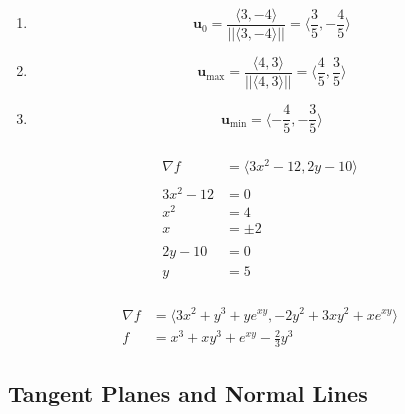 \documentclass{article}
\begin{document}
\setcounter{subsubsection}{32}
\subsubsection{}

\begin{enumerate}
  \item \[\mathbf{u}_0 = \frac{\langle 3, -4 \rangle}{||\langle 3, -4 \rangle||} = \langle \frac{3}{5}, -\frac{4}{5} \rangle\]

  \item \[\mathbf{u}_\text{max} = \frac{\langle 4, 3 \rangle}{||\langle 4, 3 \rangle||} = \langle \frac{4}{5}, \frac{3}{5} \rangle\]

  \item \[\mathbf{u}_\text{min} = \langle -\frac{4}{5}, -\frac{3}{5} \rangle\]
\end{enumerate}

\setcounter{subsubsection}{36}
\subsubsection{}

\begin{align*}
  \nabla f   & = \langle 3 x^2 - 12, 2 y - 10 \rangle \\ \\
  3 x^2 - 12 & = 0                                    \\
  x^2        & = 4                                    \\
  x          & = \pm 2                                \\ \\
  2 y - 10   & = 0                                    \\
  y          & = 5
\end{align*}

\setcounter{subsubsection}{42}
\subsubsection{}

\begin{align*}
  \nabla f & = \langle 3 x^2 + y^3 + y e^{x y}, -2 y^2 + 3 x y^2 + x e^{x y} \rangle \\
  f        & = x^3 + x y^3 + e^{x y} - \frac{2}{3} y^3
\end{align*}

\subsection{Tangent Planes and Normal Lines}
\end{document}
